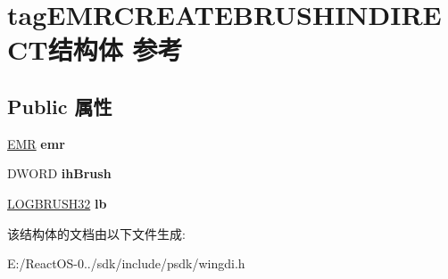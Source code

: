 \hypertarget{structtag_e_m_r_c_r_e_a_t_e_b_r_u_s_h_i_n_d_i_r_e_c_t}{}\section{tag\+E\+M\+R\+C\+R\+E\+A\+T\+E\+B\+R\+U\+S\+H\+I\+N\+D\+I\+R\+E\+C\+T结构体 参考}
\label{structtag_e_m_r_c_r_e_a_t_e_b_r_u_s_h_i_n_d_i_r_e_c_t}
\subsection*{Public 属性}
\begin{DoxyCompactItemize}
\item 
\mbox{\label{structtag_e_m_r_c_r_e_a_t_e_b_r_u_s_h_i_n_d_i_r_e_c_t_ad18ce2ad3521568519d671c992e6132d}} 
\hyperlink{structtag_e_m_r}{E\+MR} {\bfseries emr}
\item 
\mbox{\label{structtag_e_m_r_c_r_e_a_t_e_b_r_u_s_h_i_n_d_i_r_e_c_t_af048bf8c6419ee0674cf2691e7bcf125}} 
D\+W\+O\+RD {\bfseries ih\+Brush}
\item 
\mbox{\label{structtag_e_m_r_c_r_e_a_t_e_b_r_u_s_h_i_n_d_i_r_e_c_t_a5dedcd6f26fe97893f62bc5237833cff}} 
\hyperlink{structtag_l_o_g_b_r_u_s_h32}{L\+O\+G\+B\+R\+U\+S\+H32} {\bfseries lb}
\end{DoxyCompactItemize}


该结构体的文档由以下文件生成\+:\begin{DoxyCompactItemize}
\item 
E\+:/\+React\+O\+S-\/0../sdk/include/psdk/wingdi.\+h\end{DoxyCompactItemize}
